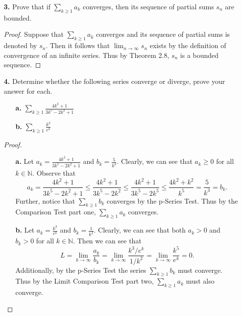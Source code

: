 \documentclass[ 12pt ]{article}
\begin{document}
\begin{enumerate}
		\begin{proof}
			First observe that $$\sum_{k \geq 1} \frac{(-1)^{k+2}}{e^{k-1}} = -\sum_{k \geq 1} \frac{(-1)^{k-1}}{e^{k-1}} = -\sum_{k \geq 0} \left ( \frac{-1}{e} \right )^k$$
			Let $b_k = -\left ( \frac{-1}{e} \right )^k$ and $a_k = -b_k$. Observe that $a_k$ is a geometric sequence where $|x| = \left |
			\frac{-1}{e} \right | < 1$. Hence, by the Geometric Series, $\sum_{k \geq 1} a_n$ converges to $\frac{1}{1-\left (\frac{-1}{e} \right )} = \frac{e}{1 + e}$. Thus by
			Theorem 6.10, $\sum_{k \geq 1} -a_k = \sum_{k \geq 1} b_k$ converges to the value $-\frac{e}{1 + e}$.
		\end{proof}
		\newpage


	\item[\textbf{3.}] Prove that if $\sum_{k \geq 1} a_k$ converges, then its sequence of partial sums $s_n$ are bounded.

		\begin{proof}
			Suppose that $\sum_{k \geq 1} a_k$ converges and its sequence of partial sums is denoted by $s_n$. Then it follows that $\lim_{n \to \infty} s_n$ exists by the definition
			of convergence of an infinite series. Thus by Theorem 2.8, $s_n$ is a bounded sequence.
		\end{proof}


	\item[\textbf{4.}] Determine whether the following series converge or diverge, prove your answer for each.
		\begin{enumerate}
			\item[\textbf{a.}] $\sum_{k \geq 1} \frac{4k^2 + 1}{3k^5 - 2k^2 + 1}$
			\item[\textbf{b.}] $\sum_{k \geq 1} \frac{k^3}{e^k}$
		\end{enumerate}

		\begin{proof}
			\begin{enumerate}
				\item[\textbf{a.}] Let $a_k = \frac{4k^2 + 1}{3k^5 - 2k^2 + 1}$ and $b_k = \frac{5}{k^3}$. Clearly, we can see that $a_k \geq 0$ for all $k \in \mathbb{N}$. Observe that
					$$a_k = \frac{4k^2 + 1}{3k^5 - 2k^2 + 1} \leq \frac{4k^2 + 1}{3k^5 - 2k^2} \leq \frac{4k^2 + 1}{3k^5 - 2k^5} \leq \frac{4k^2 + k^2}{k^5} = \frac{5}{k^3} = b_k.$$
					Further, notice that $\sum_{k \geq 1} b_k$ converges by the p-Series Test. Thus by the Comparison Test part one, $\sum_{k \geq 1} a_k$ converges.

				\item[\textbf{b.}] Let $a_k = \frac{k^3}{e^k}$ and $b_k = \frac{1}{k^2}$. Clearly, we can see that both $a_k > 0$ and $b_k > 0$ for all $k \in \mathbb{N}$. Then we can
					see that $$L = \lim_{k \to \infty} \frac{a_k}{b_k} = \lim_{k \to \infty} \frac{k^3 / e^k}{1 / k^2} = \lim_{k \to \infty} \frac{k^5}{e^k} = 0.$$ Additionally, by the
					p-Series Test the series $\sum_{k \geq 1} b_k$ must converge. Thus by the Limit Comparison Test part two, $\sum_{k \geq 1} a_k$ must also converge.
			\end{enumerate}
		\end{proof}
\end{enumerate}
\end{document}
